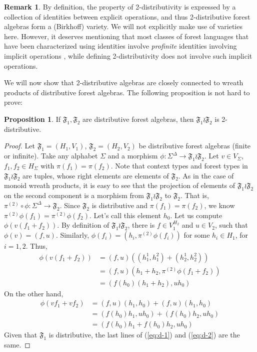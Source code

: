 \documentclass[sigplan,9pt]{acmart}\settopmatter{printfolios=true,printccs=false,printacmref=false}
\newcounter{thm}
\newcounter{theorem}
\theoremstyle{definition}
\newtheorem{prop}[thm]{Proposition}
\newtheorem{remark}[thm]{Remark}
\newcommand{\Ff}[0]{{\mathfrak{F}}}
\begin{document}
\begin{remark}
By definition, the property of 2-distributivity is expressed by a collection of identities between explicit operations, and thus 2-distributive forest algebras form a (Birkhoff) variety. We will not explicitly make use of varieties here.
However, it deserves mentioning that most classes of forest languages that have been characterized using identities involve \emph{profinite} identities involving implicit operations \cite{bojanczyk-effective-2008}, while defining 2-distributivity does not involve such implicit operations.
\end{remark}

We will now show that 2-distributive algebras are closely connected to wreath products of distributive forest algebras.
The following proposition is not hard to prove:
\begin{prop}\label{prop:wreath-2}
If $\Ff_1, \Ff_2$ are distributive forest algebras, then $\Ff_1 \wr \Ff_2$ is 2-distributive.
\end{prop}

\begin{proof}
Let $\Ff_1 = (H_1,V_1)$, $\Ff_2 = (H_2, V_2)$ be distributive forest algebras (finite or infinite).
Take any alphabet $\Sigma$ and a morphism $\phi : \Sigma^\Delta \rightarrow \Ff_1 \wr \Ff_2$.
Let $v \in V_\Sigma$, $f_1, f_2 \in H_\Sigma$ with $\pi(f_1) = \pi(f_2)$.
Note that context types and forest types in $\Ff_1 \wr \Ff_2$ are tuples, whose right elements are elements of $\Ff_2$.
As in the case of monoid wreath products, it is easy to see that the projection of elements of $\Ff_1 \wr \Ff_2$ on the second component is a morphism from $\Ff_1 \wr \Ff_2$ to $\Ff_2$.
That is, $\pi^{(2)}\circ \phi : \Sigma^\Delta \rightarrow \Ff_2$.
Since $\Ff_2$ is distributive and $\pi(f_1) = \pi(f_2)$, we know $\pi^{(2)}\phi(f_1) = \pi^{(2)}\phi(f_2)$. 
Let's call this element $h_0$.
Let us compute $\phi(v(f_1+f_2))$.
By definition of $\Ff_1 \wr \Ff_2$, there is $f \in V_1^{H_2}$ and $u \in V_2$, such that $\phi(v) = (f,u)$.
Similarly, $\phi(f_i) = (h_i, \pi^{(2)}\phi(f_i))$ for some $h_i \in H_1$, for $i = 1,2$.
Thus,
\begin{equation}\label{eq:d-1}
\begin{split}
\phi(v(f_1+f_2)) &= (f,u) ((h_1^1, h_1^2) + (h_2^1, h_2^2)) \\
& = (f,u) (h_1+h_2, \pi^{(2)}\phi(f_1+f_2)) \\
& = (f(h_0)(h_1+h_2), u h_0) 
\end{split}
\end{equation}
On the other hand,
\begin{equation}\label{eq:d-2}
\begin{split}
\phi(vf_1+vf_2) &= (f,u) (h_1, h_0) + (f,u) (h_1,h_0) \\
&= (f(h_0)h_1, u h_0)+(f(h_0)h_2, u h_0) \\
& = (f(h_0)h_1+f(h_0)h_2, u h_0)
\end{split}
\end{equation}
Given that $\Ff_1$ is distributive, the last lines of (\ref{eq:d-1}) and (\ref{eq:d-2}) are the same.
\end{proof}
\end{document}
